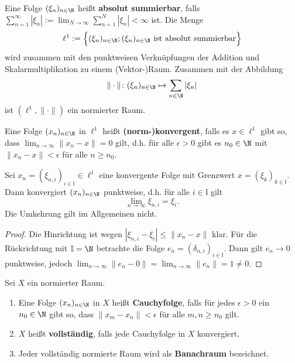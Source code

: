 \begin{bem}
\end{bem}

\begin{konstr}
  Eine Folge $(\xi_n)_{n\in \N}$ heißt \textbf{absolut summierbar}, falls $\sum_{n=1}^\infty |\xi_n|:=\lim_{N\to\infty}\sum_{n=1}^N|\xi_n|<\infty$ ist. Die Menge $$\ell^1:=\Big\{(\xi_n)_{n\in \N}; (\xi_n)_{n\in\N}\text{ ist absolut summierbar}\Big\}$$ wird zusammen mit den punktweisen Verknüpfungen der Addition und Skalarmultiplikation zu einem (Vektor-)Raum. Zusammen mit der Abbildung $$\|\cdot\| \colon (\xi_n)_{n\in \N}\mapsto \sum_{n\in \N}|\xi_n|$$ ist  $(\ell^1,\|\cdot\|)$ ein normierter Raum.
\end{konstr}

\begin{defi}[Normkonvergenz]
  Eine Folge $(x_n)_{n\in \N}$ in $\ell^1$ heißt \textbf{(norm-)konvergent}, falls es $x\in \ell^1$ gibt so, dass $\lim_{n\to\infty}\|x_n-x\|=0$ gilt, d.h. für alle $\epsilon>0$ gibt es $n_0\in\N$ mit $\|x_n-x\|<\epsilon$ für alle $n\geq n_0$.
\end{defi}

\begin{prop}
  Sei $x_n=(\xi_{n,i})_{i\in\mathbb I}\in \ell^1$ eine konvergente Folge mit Grenzwert $x=(\xi_k)_{k\in \mathbb I}$. Dann konvergiert $(x_n)_{n\in\N}$ punktweise, d.h. für alle $i\in \mathbb I$ gilt $$\lim_{n\to\infty}\xi_{n,i}=\xi_i.$$Die Umkehrung gilt im Allgemeinen nicht.
\end{prop}

\begin{proof}
Die Hinrichtung ist wegen $|\xi_{n,i}-\xi_i|\leq \|x_n-x\|$ klar. Für die Rückrichtung mit $\mathbb I=\N$ betrachte die Folge $e_n=(\delta_{n,i})_{i\in\mathbb I}$. Dann gilt $e_n\to 0$ punktweise, jedoch $\lim_{n\to\infty}\|e_n-0\|=\lim_{n\to\infty}\|e_n\|=1\neq 0$.
\end{proof}

\begin{defi}
  Sei $X$ ein normierter Raum.
  \begin{enumerate}
      \item Eine Folge $(x_n)_{n\in\N}$ in $X$ heißt \textbf{Cauchyfolge}, falls für jedes $\epsilon>0$ ein $n_0\in \N$ gibt so, dass $\|x_m-x_n\|< \epsilon$ für alle $m,n\geq n_0$ gilt.
      \item $X$ heißt \textbf{vollständig}, falls jede Cauchyfolge in $X$ konvergiert.
      \item Jeder vollständig normierte Raum wird als \textbf{Banachraum} bezeichnet.
  \end{enumerate}
\end{defi}

